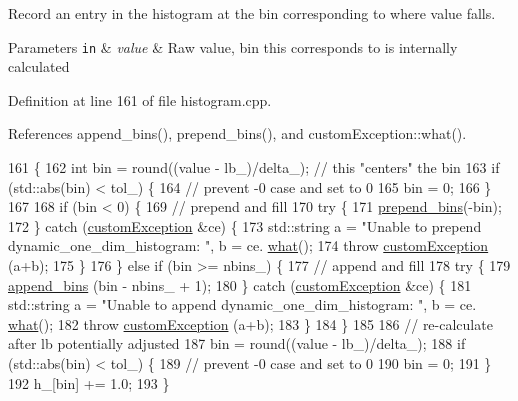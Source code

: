 Record an entry in the histogram at the bin corresponding to where value falls. 


\begin{DoxyParams}[1]{Parameters}
\mbox{\tt in}  & {\em value} & Raw value, bin this corresponds to is internally calculated \\
\hline
\end{DoxyParams}


Definition at line 161 of file histogram.\-cpp.



References append\-\_\-bins(), prepend\-\_\-bins(), and custom\-Exception\-::what().


\begin{DoxyCode}
161                                                           \{
162     \textcolor{keywordtype}{int} bin = round((value - lb\_)/delta\_); \textcolor{comment}{// this "centers" the bin}
163     \textcolor{keywordflow}{if} (std::abs(bin) < tol\_) \{
164         \textcolor{comment}{// prevent -0 case and set to 0}
165         bin = 0;
166     \}
167 
168     \textcolor{keywordflow}{if} (bin < 0) \{
169         \textcolor{comment}{// prepend and fill}
170         \textcolor{keywordflow}{try} \{
171             \hyperlink{classdynamic__one__dim__histogram_a03402a7219e10240803609fb6cbb24a6}{prepend\_bins}(-bin);
172         \} \textcolor{keywordflow}{catch} (\hyperlink{classcustom_exception}{customException} &ce) \{
173             std::string a = \textcolor{stringliteral}{"Unable to prepend dynamic\_one\_dim\_histogram: "}, b = ce.
      \hyperlink{classcustom_exception_aeb6ab5848b038adfc68fde86a512f691}{what}();
174             \textcolor{keywordflow}{throw} \hyperlink{classcustom_exception}{customException} (a+b);
175         \}
176     \} \textcolor{keywordflow}{else} \textcolor{keywordflow}{if} (bin >= nbins\_) \{
177         \textcolor{comment}{// append and fill}
178         \textcolor{keywordflow}{try} \{
179             \hyperlink{classdynamic__one__dim__histogram_a6fa516279d227e363aa90baf29f8a181}{append\_bins} (bin - nbins\_ + 1);
180         \} \textcolor{keywordflow}{catch} (\hyperlink{classcustom_exception}{customException} &ce) \{
181             std::string a = \textcolor{stringliteral}{"Unable to append dynamic\_one\_dim\_histogram: "}, b = ce.
      \hyperlink{classcustom_exception_aeb6ab5848b038adfc68fde86a512f691}{what}();
182             \textcolor{keywordflow}{throw} \hyperlink{classcustom_exception}{customException} (a+b);
183         \}
184     \}
185 
186     \textcolor{comment}{// re-calculate after lb potentially adjusted}
187     bin = round((value - lb\_)/delta\_);
188     \textcolor{keywordflow}{if} (std::abs(bin) < tol\_) \{
189             \textcolor{comment}{// prevent -0 case and set to 0}
190             bin = 0;
191     \}
192     h\_[bin] += 1.0;
193 \}
\end{DoxyCode}
